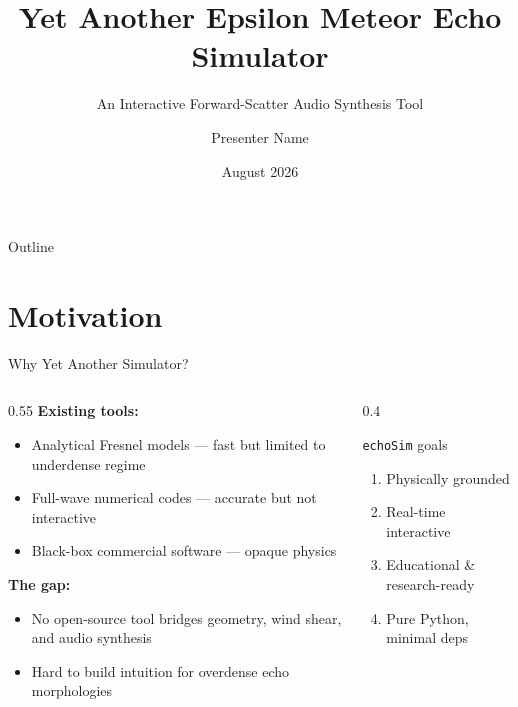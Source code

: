 \documentclass[aspectratio=169,11pt]{beamer}
\title{Yet Another Epsilon Meteor Echo Simulator}
\subtitle{An Interactive Forward-Scatter Audio Synthesis Tool}
\author{Presenter Name}
\institute{International Meteor Conference 2026}
\date{August 2026}
\begin{document}
\begin{frame}
\titlepage
\end{frame}

\begin{frame}{Outline}
\tableofcontents
\end{frame}

\section{Motivation}
\begin{frame}{Why Yet Another Simulator?}
\begin{columns}
\begin{column}{0.55\textwidth}
\textbf{Existing tools:}
\begin{itemize}
    \item Analytical Fresnel models --- fast but limited to underdense regime
    \item Full-wave numerical codes --- accurate but not interactive
    \item Black-box commercial software --- opaque physics
\end{itemize}
\vspace{0.5em}
\textbf{The gap:}
\begin{itemize}
    \item No open-source tool bridges geometry, wind shear, and audio synthesis
    \item Hard to build intuition for overdense echo morphologies
\end{itemize}
\end{column}
\begin{column}{0.4\textwidth}
\begin{block}{\texttt{echoSim} goals}
\begin{enumerate}
    \item Physically grounded
    \item Real-time interactive
    \item Educational \& research-ready
    \item Pure Python, minimal deps
\end{enumerate}
\end{block}
\end{column}
\end{columns}
\end{frame}
\end{document}
